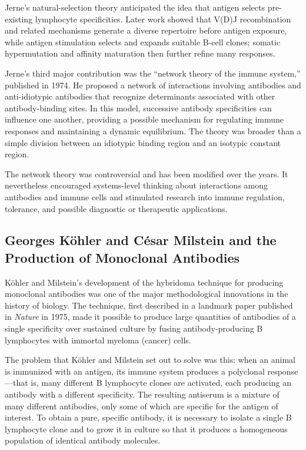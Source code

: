 Jerne's natural-selection theory anticipated the idea that antigen selects pre-existing lymphocyte specificities. Later work showed that V(D)J recombination and related mechanisms generate a diverse repertoire before antigen exposure, while antigen stimulation selects and expands suitable B-cell clones; somatic hypermutation and affinity maturation then further refine many responses.

Jerne's third major contribution was the ``network theory of the immune system,'' published in 1974. He proposed a network of interactions involving antibodies and anti-idiotypic antibodies that recognize determinants associated with other antibody-binding sites. In this model, successive antibody specificities can influence one another, providing a possible mechanism for regulating immune responses and maintaining a dynamic equilibrium. The theory was broader than a simple division between an idiotypic binding region and an isotypic constant region.

The network theory was controversial and has been modified over the years. It nevertheless encouraged systems-level thinking about interactions among antibodies and immune cells and stimulated research into immune regulation, tolerance, and possible diagnostic or therapeutic applications.

\subsection{Georges K\"ohler and C\'esar Milstein and the Production of Monoclonal Antibodies}

K\"ohler and Milstein's development of the hybridoma technique for producing monoclonal antibodies was one of the major methodological innovations in the history of biology. The technique, first described in a landmark paper published in \emph{Nature} in 1975, made it possible to produce large quantities of antibodies of a single specificity over sustained culture by fusing antibody-producing B lymphocytes with immortal myeloma (cancer) cells.

The problem that K\"ohler and Milstein set out to solve was this: when an animal is immunized with an antigen, its immune system produces a polyclonal response---that is, many different B lymphocyte clones are activated, each producing an antibody with a different specificity. The resulting antiserum is a mixture of many different antibodies, only some of which are specific for the antigen of interest. To obtain a pure, specific antibody, it is necessary to isolate a single B lymphocyte clone and to grow it in culture so that it produces a homogeneous population of identical antibody molecules.

